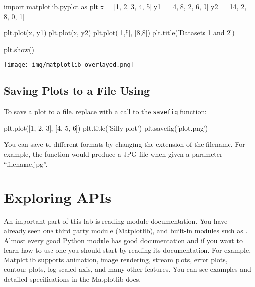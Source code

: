 \documentclass[11pt]{cselabheader}
\begin{document}
\begin{python3code}
import matplotlib.pyplot as plt
x = [1, 2, 3, 4, 5]
y1 = [4, 8, 2, 6, 0]
y2 = [14, 2, 8, 0, 1]

plt.plot(x, y1)
plt.plot(x, y2)
plt.plot([1,5], [8,8])
plt.title('Datasets 1 and 2')

plt.show()
\end{python3code}

\begin{center}
\texttt{[image: img/matplotlib\_overlayed.png]}
\end{center}

\subsection{Saving Plots to a File Using }
To save a plot to a file, replace  with a call to
the \texttt{savefig} function:

\begin{python3code}
plt.plot([1, 2, 3], [4, 5, 6])
plt.title('Silly plot')
plt.savefig('plot.png')
\end{python3code}

You can save to different formats by changing the extension of the filename.
For example, the function would produce a JPG file when given a parameter
``filename.jpg''.

\section{Exploring APIs}
An important part of this lab is reading module documentation. You
have already seen one third party module (Matplotlib), and
built-in modules such as . Almost every good Python
module has good documentation and if you want to learn how to use one
you should start by reading its documentation.  For example, Matplotlib
supports animation, image rendering, stream plots, error plots,
contour plots, log scaled axis, and many other features. You can see
examples and detailed specifications in the Matplotlib docs.
\end{document}
